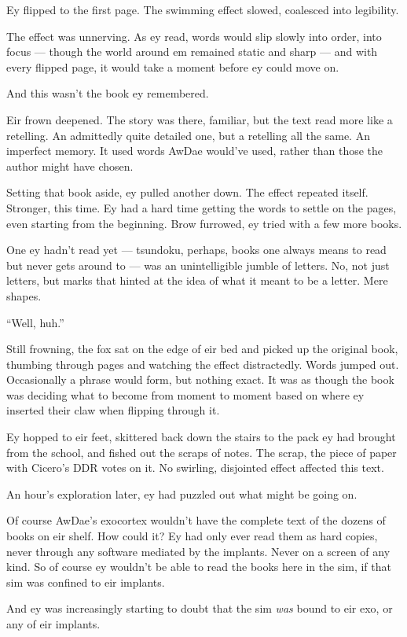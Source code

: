 Ey flipped to the first page. The swimming effect slowed, coalesced into legibility.

The effect was unnerving. As ey read, words would slip slowly into order, into focus — though the world around em remained static and sharp — and with every flipped page, it would take a moment before ey could move on.

And this wasn't the book ey remembered.

Eir frown deepened. The story was there, familiar, but the text read more like a retelling. An admittedly quite detailed one, but a retelling all the same. An imperfect memory. It used words AwDae would've used, rather than those the author might have chosen.

Setting that book aside, ey pulled another down. The effect repeated itself. Stronger, this time. Ey had a hard time getting the words to settle on the pages, even starting from the beginning. Brow furrowed, ey tried with a few more books.

One ey hadn't read yet — tsundoku, perhaps, books one always means to read but never gets around to — was an unintelligible jumble of letters. No, not just letters, but marks that hinted at the idea of what it meant to be a letter. Mere shapes.

``Well, huh.''

Still frowning, the fox sat on the edge of eir bed and picked up the original book, thumbing through pages and watching the effect distractedly. Words jumped out. Occasionally a phrase would form, but nothing exact. It was as though the book was deciding what to become from moment to moment based on where ey inserted their claw when flipping through it.

Ey hopped to eir feet, skittered back down the stairs to the pack ey had brought from the school, and fished out the scraps of notes. The scrap, the piece of paper with Cicero's DDR votes on it. No swirling, disjointed effect affected this text.

An hour's exploration later, ey had puzzled out what might be going on.

Of course AwDae's exocortex wouldn't have the complete text of the dozens of books on eir shelf. How could it? Ey had only ever read them as hard copies, never through any software mediated by the implants. Never on a screen of any kind. So of course ey wouldn't be able to read the books here in the sim, if that sim was confined to eir implants.

And ey was increasingly starting to doubt that the sim \emph{was} bound to eir exo, or any of eir implants.

